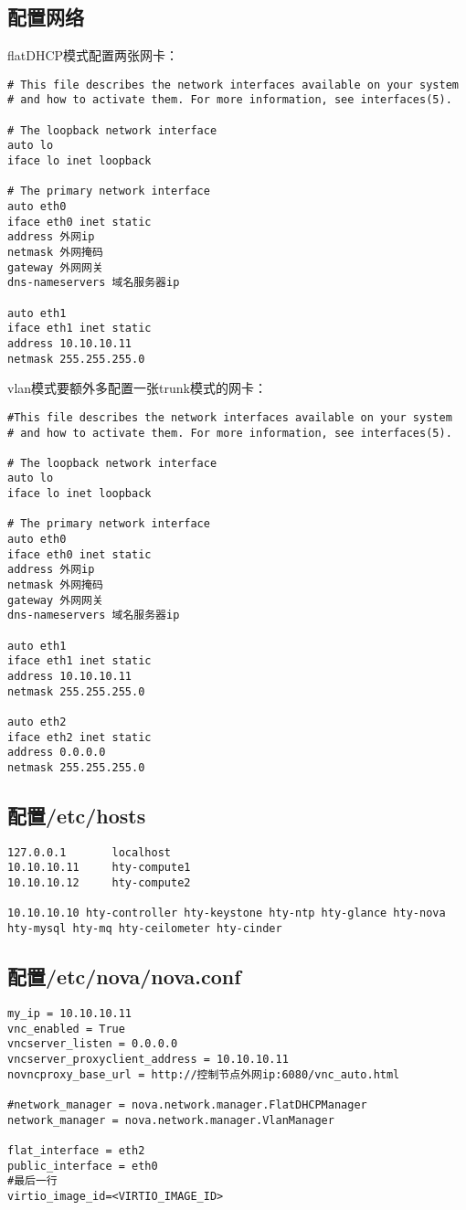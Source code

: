 \documentclass[a4paper,left=1.5cm,right=1.5cm,11pt]{article}
\begin{document}
\subsection{配置网络}
flatDHCP模式配置两张网卡：\\
\begin{lstlisting}
# This file describes the network interfaces available on your system
# and how to activate them. For more information, see interfaces(5).

# The loopback network interface
auto lo
iface lo inet loopback

# The primary network interface
auto eth0
iface eth0 inet static
address 外网ip
netmask 外网掩码
gateway 外网网关
dns-nameservers 域名服务器ip

auto eth1
iface eth1 inet static
address 10.10.10.11
netmask 255.255.255.0
\end{lstlisting}
vlan模式要额外多配置一张trunk模式的网卡：\\
\begin{lstlisting}
#This file describes the network interfaces available on your system
# and how to activate them. For more information, see interfaces(5).

# The loopback network interface
auto lo
iface lo inet loopback

# The primary network interface
auto eth0
iface eth0 inet static
address 外网ip
netmask 外网掩码
gateway 外网网关
dns-nameservers 域名服务器ip

auto eth1
iface eth1 inet static
address 10.10.10.11
netmask 255.255.255.0

auto eth2
iface eth2 inet static
address 0.0.0.0
netmask 255.255.255.0
\end{lstlisting}
\subsection{配置/etc/hosts}
\begin{lstlisting}
127.0.0.1       localhost
10.10.10.11     hty-compute1
10.10.10.12     hty-compute2

10.10.10.10 hty-controller hty-keystone hty-ntp hty-glance hty-nova hty-mysql hty-mq hty-ceilometer hty-cinder
\end{lstlisting}
\subsection{配置/etc/nova/nova.conf}
\begin{lstlisting}
my_ip = 10.10.10.11
vnc_enabled = True
vncserver_listen = 0.0.0.0
vncserver_proxyclient_address = 10.10.10.11
novncproxy_base_url = http://控制节点外网ip:6080/vnc_auto.html

#network_manager = nova.network.manager.FlatDHCPManager
network_manager = nova.network.manager.VlanManager

flat_interface = eth2
public_interface = eth0
#最后一行
virtio_image_id=<VIRTIO_IMAGE_ID>
\end{lstlisting}
\end{document}
